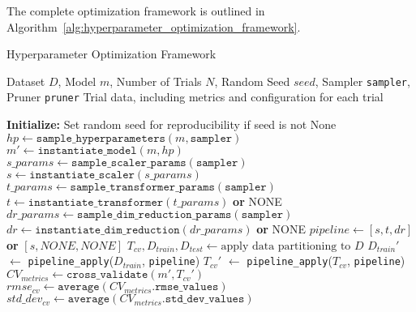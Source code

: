 The complete optimization framework is outlined in Algorithm~\ref{alg:hyperparameter_optimization_framework}.

\begin{algorithm}
\caption{Hyperparameter Optimization Framework}
\label{alg:hyperparameter_optimization_framework}
\begin{algorithmic}[1]
\Require Dataset $D$, Model $m$, Number of Trials $N$, Random Seed $seed$, Sampler \texttt{sampler}, Pruner \texttt{pruner}
\Ensure Trial data, including metrics and configuration for each trial

\State \textbf{Initialize:} Set random seed for reproducibility if seed is not None \label{step:initialize}
 \label{step:trial_loop}
    \State $hp \gets \texttt{sample\_hyperparameters}(m, \texttt{sampler})$ \label{step:sample_hyperparameters}
    \State $m' \gets \texttt{instantiate\_model}(m, hp)$ \label{step:instantiate_model}
    \Statex
    \State $s\_params \gets \texttt{sample\_scaler\_params}(\texttt{sampler})$ \label{step:sample_scaler_params}
    \State $s \gets \texttt{instantiate\_scaler}(s\_params)$ \label{step:instantiate_scaler}
    \State $t\_params \gets \texttt{sample\_transformer\_params}(\texttt{sampler})$ \label{step:sample_transformer_params}
    \State $t \gets \texttt{instantiate\_transformer}(t\_params)$ \newline \hspace*{3em} \textbf{or} NONE \label{step:instantiate_transformer}
    \State $dr\_params \gets \texttt{sample\_dim\_reduction\_params}(\texttt{sampler})$ \label{step:sample_dim_reduction_params}
    \State $dr \gets \texttt{instantiate\_dim\_reduction}(dr\_params)$ \newline \hspace*{3em}\textbf{or} NONE \label{step:instantiate_dim_reduction}
    \Statex     
    \State $pipeline \gets [s, t, dr]$ \textbf{or} $[s, NONE, NONE]$ \label{step:construct_pipeline}
    \State $T_{cv}, D_{train}, D_{test} \gets \text{apply data partitioning to } D$ \label{step:data_partitioning}
    \Statex
    \State $D_{train}'$ $\gets$ \texttt{pipeline\_apply}($D_{train}$, \texttt{pipeline}) \label{step:apply_pipeline_train}
    \State $T_{cv}'$ $\gets$ \texttt{pipeline\_apply}($T_{cv}$, \texttt{pipeline}) \label{step:apply_pipeline_cv}
    \Statex
    \State $CV_{metrics} \gets \texttt{cross\_validate}(m', T_{cv}')$ \label{step:cross_validate}
    \State $rmse_{cv} \gets \texttt{average}(CV_{metrics}.\texttt{rmse\_values})$ \label{step:average_rmse_cv}
    \State $std\_dev_{cv} \gets \texttt{average}(CV_{metrics}.\texttt{std\_dev\_values})$ \label{step:average_std_dev_cv}

\end{algorithmic}
\end{algorithm}
